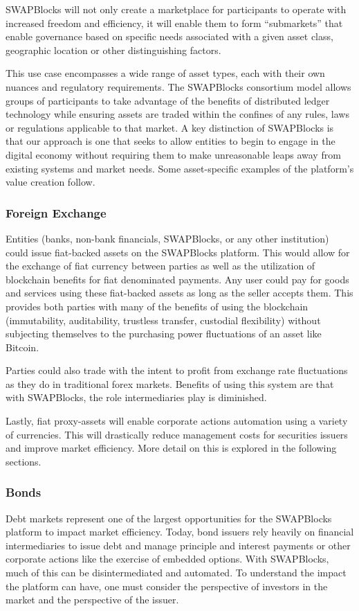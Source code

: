 \documentclass[12pt]{article}
\begin{document}
SWAPBlocks will not only create a marketplace for participants to operate with increased freedom and efficiency, 
it will enable them to form “submarkets” that enable governance based on specific needs associated with a given 
asset class, geographic location or other distinguishing factors.

This use case encompasses a wide range of asset types, each with their own nuances and regulatory requirements. 
The SWAPBlocks consortium model allows groups of participants to take advantage of the benefits of distributed 
ledger technology while ensuring assets are traded within the confines of any rules, laws or regulations 
applicable to that market. A key distinction of SWAPBlocks is that our approach is one that seeks to allow entities 
to begin to engage in the digital economy without requiring them to make unreasonable leaps away from existing 
systems and market needs. Some asset-specific examples of the platform’s value creation follow.

\subsubsection{Foreign Exchange}

Entities (banks, non-bank financials, SWAPBlocks, or any other institution) could issue fiat-backed assets on 
the SWAPBlocks platform. This would allow for the exchange of fiat currency between parties as well as the utilization 
of blockchain benefits for fiat denominated payments. Any user could pay for goods and services using these fiat-backed 
assets as long as the seller accepts them. This provides both parties with many of the benefits of using the 
blockchain (immutability, auditability, trustless transfer, custodial flexibility) without subjecting themselves to 
the purchasing power fluctuations of an asset like Bitcoin.

Parties could also trade with the intent to profit from exchange rate fluctuations as they do in traditional forex markets. Benefits of 
using this system are that with SWAPBlocks, the role intermediaries play is diminished.

Lastly, fiat proxy-assets will enable corporate actions automation using a variety of currencies. This will drastically reduce management costs for securities issuers and improve market efficiency. More detail on this is explored in the following sections.


\subsubsection{Bonds}
Debt markets represent one of the largest opportunities for the SWAPBlocks platform to impact market efficiency. 
Today, bond issuers rely heavily on financial intermediaries to issue debt and manage principle and interest payments 
or other corporate actions like the exercise of embedded options. With SWAPBlocks, much of this can be disintermediated 
and automated. To understand the impact the platform can have, one must consider the perspective of investors in 
the market and the perspective of the issuer.
\end{document}
